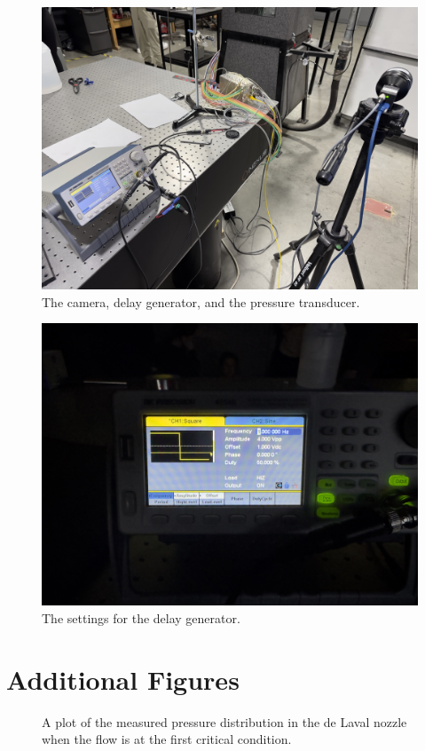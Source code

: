 \begin{figure}[htpb]
    \centering
    \includegraphics[width=0.75\linewidth]{Figures/delay_generator_and_schlieren.jpeg}
    \caption{The camera, delay generator, and the pressure transducer.}
    \label{fig:delay_generator}
\end{figure}

\begin{figure}[htpb]
    \centering
    \includegraphics[width=0.75\linewidth]{Figures/delay_generator_settings.jpeg}
    \caption{The settings for the delay generator.}
    \label{fig:delay_generator_settings}
\end{figure}

\newpage

\section{Additional Figures} \label{sec:additional_figures}

\begin{figure}[htpb]
    \centering
    
    \caption{A plot of the measured pressure distribution in the de Laval nozzle when the flow is at the first critical condition.}
    \label{fig:measured_pressure_1st_critical}
\end{figure}

